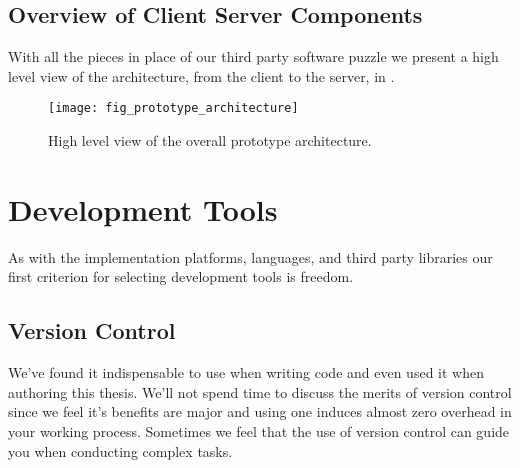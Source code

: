 \subsection{Overview of Client \oldand Server Components}

With all the pieces in place of our third party software puzzle
we present a high level view of the architecture, from the client to the
server, in
.

\begin{figure}
  \begin{whole}
    \centering
    \texttt{[image: fig\_prototype\_architecture]}
    \caption[Prototype Architecture]{
      High level view of the overall prototype architecture.
    }
    \label{figure:fig.prototype.architecture}
  \end{whole}
\end{figure}


\section{Development Tools}

As with the implementation platforms, languages, and third party libraries
our first criterion for selecting development tools is freedom.

\subsection{Version Control}

We've found it indispensable to use  when writing code
and even used it when authoring this thesis. We'll not spend time to discuss
the merits of version control since we feel it's benefits are major and
using one induces almost zero overhead in your working process. Sometimes we
feel that the use of version control can guide you when conducting complex
tasks.

